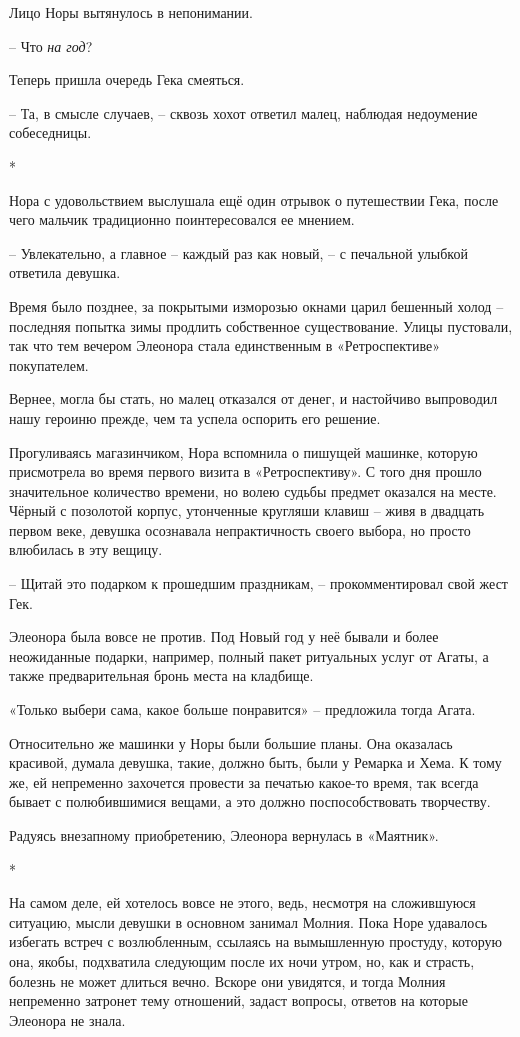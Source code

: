 \documentclass[
  a5paperpaper,
  DIV=11,
  numbers=noendperiod]{scrreprt}
\begin{document}
Лицо Норы вытянулось в непонимании.

-- Что \emph{на год}?

Теперь пришла очередь Гека смеяться.

-- Та, в смысле случаев, -- сквозь хохот ответил малец, наблюдая
недоумение собеседницы.

*

Нора с удовольствием выслушала ещё один отрывок о путешествии Гека,
после чего мальчик традиционно поинтересовался ее мнением.

-- Увлекательно, а главное -- каждый раз как новый, -- с печальной
улыбкой ответила девушка.

Время было позднее, за покрытыми изморозью окнами царил бешенный холод
-- последняя попытка зимы продлить собственное существование. Улицы
пустовали, так что тем вечером Элеонора стала единственным в
«Ретроспективе» покупателем.

Вернее, могла бы стать, но малец отказался от денег, и настойчиво
выпроводил нашу героиню прежде, чем та успела оспорить его решение.

Прогуливаясь магазинчиком, Нора вспомнила о пишущей машинке, которую
присмотрела во время первого визита в «Ретроспективу». С того дня прошло
значительное количество времени, но волею судьбы предмет оказался на
месте. Чёрный с позолотой корпус, утонченные кругляши клавиш -- живя в
двадцать первом веке, девушка осознавала непрактичность своего выбора,
но просто влюбилась в эту вещицу.

-- Щитай это подарком к прошедшим праздникам, -- прокомментировал свой
жест Гек.

Элеонора была вовсе не против. Под Новый год у неё бывали и более
неожиданные подарки, например, полный пакет ритуальных услуг от Агаты, а
также предварительная бронь места на кладбище.

«Только выбери сама, какое больше понравится» -- предложила тогда Агата.

Относительно же машинки у Норы были большие планы. Она оказалась
красивой, думала девушка, такие, должно быть, были у Ремарка и Хема. К
тому же, ей непременно захочется провести за печатью какое-то время, так
всегда бывает с полюбившимися вещами, а это должно поспособствовать
творчеству.

Радуясь внезапному приобретению, Элеонора вернулась в «Маятник».

*

На самом деле, ей хотелось вовсе не этого, ведь, несмотря на сложившуюся
ситуацию, мысли девушки в основном занимал Молния. Пока Норе удавалось
избегать встреч с возлюбленным, ссылаясь на вымышленную простуду,
которую она, якобы, подхватила следующим после их ночи утром, но, как и
страсть, болезнь не может длиться вечно. Вскоре они увидятся, и тогда
Молния непременно затронет тему отношений, задаст вопросы, ответов на
которые Элеонора не знала.
\end{document}
